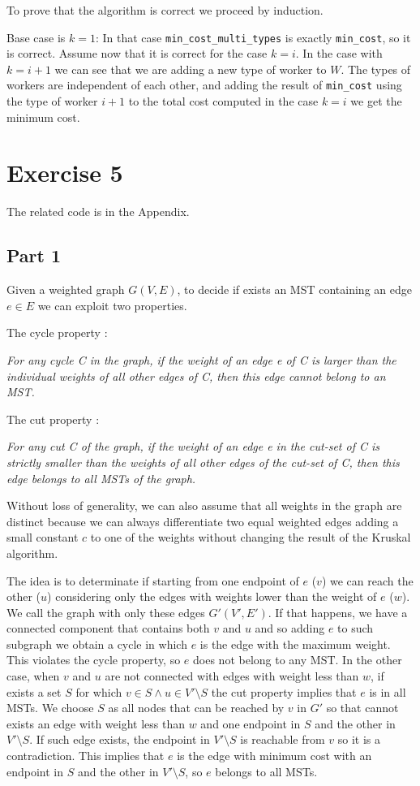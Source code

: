 \documentclass[paper=a4, fontsize=11pt]{scrartcl} %
\numberwithin{equation}{section} %
\numberwithin{figure}{section} %
\numberwithin{table}{section} %
\begin{document}
To prove that the algorithm is correct we proceed by induction.

Base case is $k=1$: In that case \verb|min_cost_multi_types| is exactly \verb|min_cost|, so it is correct.
Assume now that it is correct for the case $k = i$.
In the case with $k = i+1$ we can see that we are adding a new type of worker to $W$.
The types of workers are independent of each other, and adding the result of \verb|min_cost| using the type of worker $i+1$ to the total cost computed in the case $k=i$ we get the minimum cost.

\bigskip
\section*{Exercise 5}

The related code is in the Appendix.

\subsection*{Part 1}

Given a weighted graph $G(V, E)$, to decide if exists an MST containing an edge $e \in E$ we can exploit two properties.

The cycle property \cite{cicle_prop}:

\bigskip
{\em For any cycle C in the graph, if the weight of an edge e of C is larger than the individual weights of all other edges of C, then this edge cannot belong to an MST.} 
\bigskip

The cut property \cite{cut_prop}:

\bigskip
{\em For any cut C of the graph, if the weight of an edge e in the cut-set of C is strictly smaller than the weights of all other edges of the cut-set of C, then this edge belongs to all MSTs of the graph.} 
\bigskip

Without loss of generality, we can also assume that all weights in the graph are distinct because we can always differentiate two equal weighted edges adding a small constant $c$ to one of the weights without changing the result of the Kruskal algorithm.

The idea is to determinate if starting from one endpoint of $e$ ($v$) we can reach the other ($u$) considering only the edges with weights lower than the weight of $e$ ($w$).
We call the graph with only these edges $G'(V', E')$.
If that happens, we have a connected component that contains both $v$ and $u$ and so adding $e$ to such subgraph we obtain a cycle in which $e$ is the edge with the maximum weight. This violates the cycle property, so $e$ does not belong to any MST.
In the other case, when $v$ and $u$ are not connected with edges with weight less than $w$, if exists a set $S$ for which $v \in S \land u \in V' \setminus S$ the cut property implies that $e$ is in all MSTs.
We choose $S$ as all nodes that can be reached by $v$ in $G'$ so that cannot exists an edge with weight less than $w$ and one endpoint in $S$ and the other in $V' \setminus S$. If such edge exists, the endpoint in $V' \setminus S$ is reachable from $v$ so it is a contradiction.
This implies that $e$ is the edge with minimum cost with an endpoint in $S$ and the other in $V' \setminus S$, so $e$ belongs to all MSTs.
\end{document}

